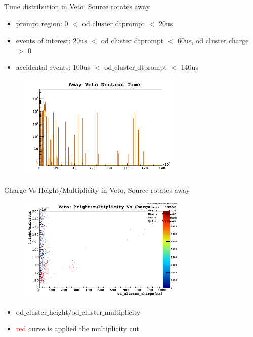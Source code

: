 \documentclass[9pt]{beamer}
\begin{document}
\begin{frame}{Time distribution in Veto, Source rotates away}
\begin{itemize}
[bullet]
\item prompt region: 0 $<$ od$\_$cluster$\_$dtprompt $<$ 20us
\item events of interest: 20us $<$ od$\_$cluster$\_$dtprompt $<$ 60us, od$\_$cluster$\_$charge $>$ 0
\item accidental events: 100us $<$ od$\_$cluster$\_$dtprompt $<$ 140us
\end{itemize}
\begin{figure}
\includegraphics[height= 5cm, width=\textwidth]{away_time_Feb7PM.png}
\end{figure}
\end{frame}

\begin{frame}{Charge Vs Height/Multiplicity in Veto, Source rotates away}
\begin{figure}
\includegraphics[height= 5cm, width=.8\textwidth]{nv_charge_height_multiplicity_away_Feb7PM.png}
\end{figure}
\begin{itemize}
[bullet]
\item od$\_$cluster$\_$height/od$\_$cluster$\_$multiplicity
\item \textcolor{red}{red} curve is applied the multiplicity cut
\end{itemize}
\end{frame}
\end{document}
